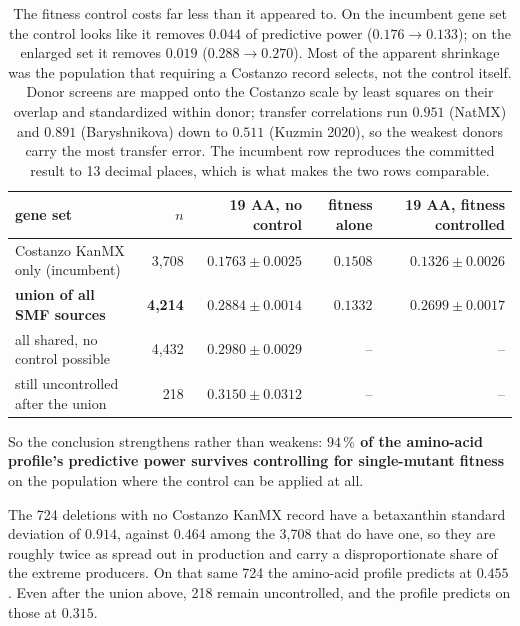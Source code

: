 \begin{table}[htbp]
\centering\small
\begin{tabular}{lrrrr}
\toprule
gene set & $n$ & 19 AA, no control & fitness alone & 19 AA, fitness controlled \\
\midrule
Costanzo KanMX only (incumbent) & 3{,}708 & $0.1763 \pm 0.0025$ & $0.1508$ & $0.1326 \pm 0.0026$ \\
\textbf{union of all SMF sources} & \textbf{4{,}214} & $\mathbf{0.2884 \pm 0.0014}$ & $0.1332$ & $\mathbf{0.2699 \pm 0.0017}$ \\
\midrule
all shared, no control possible & 4{,}432 & $0.2980 \pm 0.0029$ & -- & -- \\
still uncontrolled after the union & 218 & $0.3150 \pm 0.0312$ & -- & -- \\
\bottomrule
\end{tabular}
\caption[]{The fitness control costs far less than it appeared to. On the incumbent gene set
the control looks like it removes $0.044$ of predictive power ($0.176 \to 0.133$); on the
enlarged set it removes $0.019$ ($0.288 \to 0.270$). Most of the apparent shrinkage was the
population that requiring a Costanzo record selects, not the control itself. Donor screens
are mapped onto the Costanzo scale by least squares on their overlap and standardized within
donor; transfer correlations run $0.951$ (NatMX) and $0.891$ (Baryshnikova) down to $0.511$
(Kuzmin 2020), so the weakest donors carry the most transfer error. The incumbent row
reproduces the committed result to 13 decimal places, which is what makes the two rows
comparable.}
\label{tab:aa-fitness-union}
\end{table}

So the conclusion strengthens rather than weakens: \textbf{$94\,\%$ of the amino-acid
profile's predictive power survives controlling for single-mutant fitness} on the population
where the control can be applied at all.

 The 724 deletions
with no Costanzo KanMX record have a betaxanthin standard deviation of $0.914$, against
$0.464$ among the 3,708 that do have one, so they are roughly twice as spread out in
production and carry a disproportionate share of the extreme producers. On that same 724 the
amino-acid profile predicts at $0.455$. Even after the union above, 218 remain uncontrolled,
and the profile predicts on those at $0.315$.

